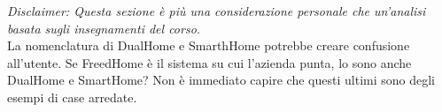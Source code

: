 \textit{Disclaimer: Questa sezione è più una considerazione personale che un'analisi basata sugli insegnamenti del corso.}\\
La nomenclatura di DualHome e SmarthHome potrebbe creare confusione all'utente. Se FreedHome è il sistema su cui l'azienda punta, lo sono anche DualHome e SmartHome? Non è immediato capire che questi ultimi sono degli esempi di case arredate.
